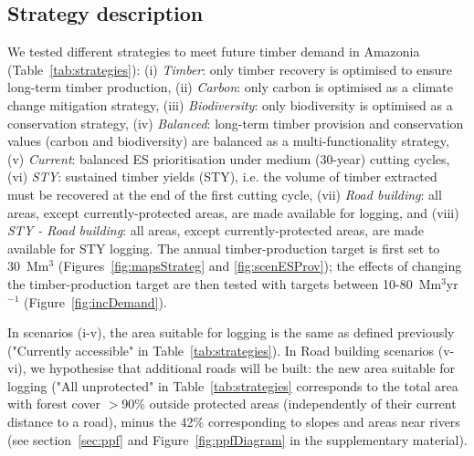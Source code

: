 \documentclass{article}
\begin{document}
\subsection{Strategy description}

We tested different strategies to meet future timber demand in Amazonia (Table~\ref{tab:strategies}): (i) \textit{Timber}: only timber recovery is optimised to ensure long-term timber production, (ii) \textit{Carbon}: only carbon is optimised as a climate change mitigation strategy, (iii) \textit{Biodiversity}: only biodiversity is optimised as a conservation strategy, (iv) \textit{Balanced}: long-term timber provision and conservation values (carbon and biodiversity) are balanced as a multi-functionality strategy, (v) \textit{Current}: balanced ES prioritisation under medium (30-year) cutting cycles, (vi) \textit{STY}: sustained timber yields (STY), i.e. the volume of timber extracted must be recovered at the end of the first cutting cycle, (vii) \textit{Road building}: all areas, except currently-protected areas, are made available for logging, and (viii) \textit{STY - Road building}: all areas, except currently-protected areas, are made available for STY logging. The annual timber-production target is first set to 30~Mm$^3$ (Figures~\ref{fig:mapsStrateg} and \ref{fig:scenESProv}); the effects of changing the timber-production target are then tested with targets between 10-80~Mm$^3$yr$^{-1}$ (Figure~\ref{fig:incDemand}). 

In scenarios (i-v), the area suitable for logging is the same as defined previously ("Currently accessible" in Table~\ref{tab:strategies}). In Road building scenarios (v-vi), we hypothesise that additional roads will be built: the new area suitable for logging ("All unprotected" in Table~\ref{tab:strategies} corresponds to the total area with forest cover $>$90\% outside protected areas (independently of their current distance to a road), minus the 42\% corresponding to slopes and areas near rivers (see section~\ref{sec:ppf} and Figure~\ref{fig:ppfDiagram} in the supplementary material). 
\end{document}
